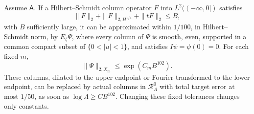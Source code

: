 \begin{lemma}
\label{AC-T43}
Assume \(\mathsf A\).
If a Hilbert--Schmidt column operator \(F\) into
\(L^2((-\infty,0])\) satisfies
\[
 \|F\|_2+\|F\|_{2,H^{1/4}}+\|tF\|_2\leq B,
 \tag{TP.10}
\]
with \(B\) sufficiently large, it can be approximated
within \(1/100\), in Hilbert--Schmidt norm, by
\(E_\zeta\Psi\), where every column of \(\Psi\) is
smooth, even, supported in a common compact subset
of \(\{0<|u|<1\}\), and satisfies \(I\psi=\psi(0)=0\).
For each fixed \(m\),
\[
                 \|\Psi\|_{2,X_m}\leq \exp(C_mB^{102}).
 \tag{TP.11}
\]
These columns, dilated to the upper endpoint or
Fourier-transformed to the lower endpoint, can be
replaced by actual columns in \(\mathcal R_\Lambda^0\)
with total target error at most \(1/50\), as soon as
\(\log\Lambda\geq C B^{102}\).
Changing these fixed tolerances changes only constants.
\end{lemma}
